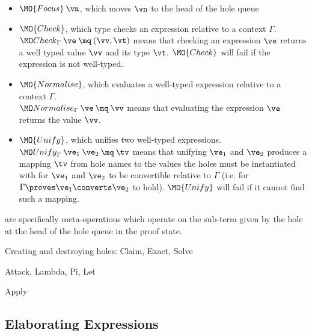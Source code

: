 \begin{itemize}
\item $\MO{Focus}\:\vn$, which moves $\vn$ to the head of the hole queue
\item $\MO{Check}$, which type checks an expression relative to a context
$\Gamma$. \\
$\Check\:\ve\:\mq\:(\vv,\vt)$ means that checking an expression $\ve$
returns a well typed value $\vv$ and its type $\vt$. $\MO{Check}$ will fail
if the expression is not well-typed.
\item $\MO{Normalise}$, which evaluates a well-typed expression relative to a context 
$\Gamma$.\\
$\Eval\:\ve\:\mq\:\vv$ means that evaluating the expression $\ve$ returns the
value $\vv$.
\item $\MO{Unify}$, which unifies two well-typed expressions.
\\
$\Unify\:\ve_1\:\ve_2\:\mq\:\tv$ means that unifying $\ve_1$ and $\ve_2$ produces a
mapping $\tv$ from hole names to the values the holes must be instantiated with for
$\ve_1$ and $\ve_2$ to be convertible relative to $\Gamma$ 
(i.e. for $\Gamma\proves\ve_1\converts\ve_2$ to hold). $\MO{Unify}$ will fail
if it cannot find such a mapping.
\end{itemize}

 are specifically meta-operations which operate on the sub-term given
by the hole at the head of the hole queue in the proof state. 


Creating and destroying holes: Claim, Exact, Solve

Attack, Lambda, Pi, Let

Apply



                             




\subsection{Elaborating Expressions}



